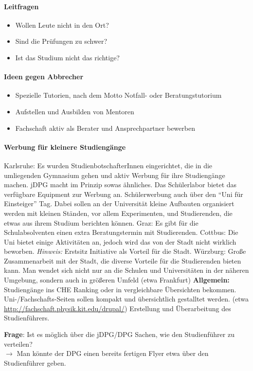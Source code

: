 		\paragraph{Leitfragen}
			\begin{itemize}
				\item Wollen Leute nicht in den Ort?
				\item Sind die Prüfungen zu schwer?
				\item Ist das Studium nicht das richtige?
			\end{itemize}

		\paragraph{Ideen gegen Abbrecher}
			\begin{itemize}
				\item Spezielle Tutorien, nach dem Motto Notfall- oder Beratungstutorium
				\item Aufstellen und Ausbilden von Mentoren
				\item Fachschaft aktiv als Berater und Ansprechpartner bewerben
			\end{itemize}

		\paragraph{Werbung für kleinere Studiengänge}
			\begin{outline}
				\1 Karlsruhe:
				  \2 Es wurden StudienbotschafterInnen eingerichtet, die in die umliegenden Gymnasium gehen und aktiv Werbung für ihre Studiengänge machen.
				  \2 jDPG macht im Prinzip sowas ähnliches.
				  \2 Das Schülerlabor bietet das verfügbare Equipment zur Werbung an.
				  \2 Schülerwerbung auch über den ``Uni für Einsteiger'' Tag. Dabei sollen an der Universität kleine Aufbauten organisiert werden mit kleinen Ständen, vor allem Experimenten, und Studierenden, die etwas aus ihrem Studium berichten können.
				\1 Graz: Es gibt für die Schulabsolventen einen extra Beratungstermin mit Studierenden.
				\1 Cottbus: Die Uni bietet einige Aktivitäten an, jedoch wird das von der Stadt nicht wirklich beworben. \textit{Hinweis:} Erstsitz Initiative als Vorteil für die Stadt.
				\1 Würzburg:
				  \2 Große Zusammenarbeit mit der Stadt, die diverse Vorteile für die Studierenden bieten kann.
				  \2 Man wendet sich nicht nur an die Schulen und Universitäten in der näheren Umgebung, sondern auch in größeren Umfeld (etwa Frankfurt)
				\1 \textbf{Allgemein:}
					\2 Studiengänge ins CHE Ranking oder in vergleichbare Übersichten bekommen.
					\2 Uni-/Fachschafts-Seiten sollen kompakt und übersichtlich gestalltet werden. (etwa \url{http://fachschaft.physik.kit.edu/drupal/})
					\2 Erstellung und Überarbeitung des Studienführers.

				\1 \textbf{Frage}: Ist es möglich über die jDPG/DPG Sachen, wie den Studienführer zu verteilen? \\
				  $\rightarrow$ Man könnte der DPG einen bereits fertigen Flyer etwa über den Studienführer geben.
			\end{outline}

